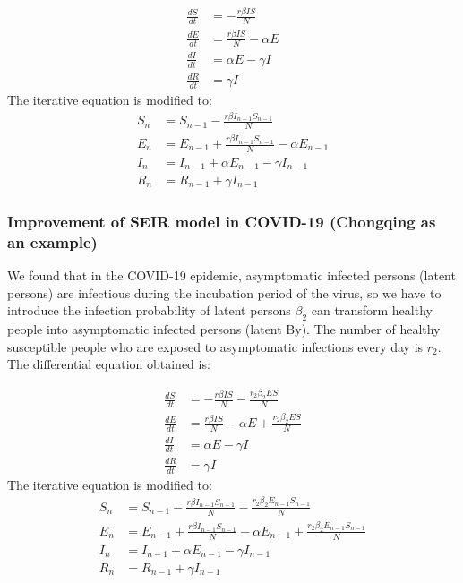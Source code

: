 \documentclass[a4paper, 11pt,twoside=true]{scrartcl}
\begin{document}
$$
\begin{aligned}
\frac{dS}{dt}&=-\frac{r\beta IS}{N}\\ 
\frac{dE}{dt}&=\frac{r\beta IS}{N}-\alpha E\\ 
\frac{dI}{dt}&=\alpha E-\gamma I\\ 
\frac{dR}{dt}&=\gamma I
\end{aligned}
$$
\noindent The iterative equation is modified to:
$$
\begin{aligned}
S_n&=S_{n-1}-\frac{r\beta I_{n-1}S_{n-1}}{N}\\ 
E_n&=E_{n-1}+\frac{r\beta I_{n-1}S_{n-1}}{N}-\alpha E_{n-1}\\ 
I_n&=I_{n-1} +\alpha E_{n-1}-\gamma I_{n-1}\\ 
R_n&=R_{n-1}+\gamma I_{n-1}
\end{aligned}
$$

\subsubsection{Improvement of SEIR model in COVID-19 (Chongqing as an example)}
\qquad We found that in the COVID-19 epidemic, asymptomatic infected persons (latent persons) are infectious during the incubation period of the virus, so we have to introduce the infection probability of latent persons $\beta_2$ can transform healthy people into asymptomatic infected persons (latent By). The number of healthy susceptible people who are exposed to asymptomatic infections every day is $r_2$. The differential equation obtained is:

$$
\begin{aligned}
\frac{dS}{dt}&=-\frac{r\beta IS}{N}-\frac{r_2 \beta_2ES}{N} \\
\frac{dE}{dt}&=\frac{r\beta IS}{N}-\alpha E+\frac{r_2 \beta_2ES}{N}  \\ 
\frac{dI}{dt}&=\alpha E-\gamma I  \\ 
\frac{dR}{dt}&=\gamma I
\end{aligned}
$$
\noindent The iterative equation is modified to:
$$
\begin{aligned}
S_n&=S_{n-1}-\frac{r\beta I_{n-1}S_{n-1}}{N}-\frac{r_2\beta_2 E_{n-1}S_{n-1}}{N}  \\
E_n&=E_{n-1}+\frac{r\beta I_{n-1}S_{n-1}}{N}-\alpha E_{n-1}+\frac{r_2\beta_2 E_{n-1}S_{n-1}}{N}  \\ 
I_n&=I_{n-1} +\alpha E_{n-1}-\gamma I_{n-1}  \\ 
R_n&=R_{n-1}+\gamma I_{n-1}
\end{aligned}
$$
\end{document}
